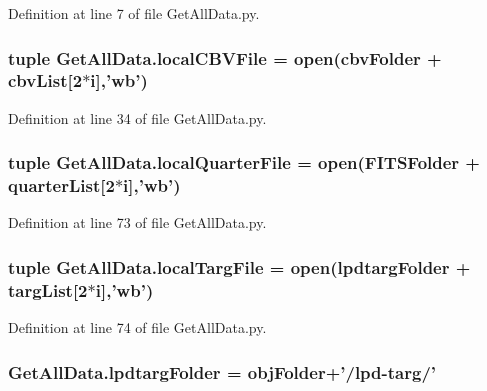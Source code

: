 Definition at line 7 of file Get\-All\-Data.\-py.

\hypertarget{namespace_get_all_data_a48b2086a8ab4a4eb4383aaa810014866}{
\subsubsection[{local\-C\-B\-V\-File}]{\setlength{\rightskip}{0pt plus 5cm}tuple Get\-All\-Data.\-local\-C\-B\-V\-File = open({\bf cbv\-Folder} + {\bf cbv\-List}\mbox{[}2$\ast$i\mbox{]},'wb')}}\label{namespace_get_all_data_a48b2086a8ab4a4eb4383aaa810014866}


Definition at line 34 of file Get\-All\-Data.\-py.

\hypertarget{namespace_get_all_data_a877740889eb38000b292aaee018666fb}{
\subsubsection[{local\-Quarter\-File}]{\setlength{\rightskip}{0pt plus 5cm}tuple Get\-All\-Data.\-local\-Quarter\-File = open({\bf F\-I\-T\-S\-Folder} + {\bf quarter\-List}\mbox{[}2$\ast$i\mbox{]},'wb')}}\label{namespace_get_all_data_a877740889eb38000b292aaee018666fb}


Definition at line 73 of file Get\-All\-Data.\-py.

\hypertarget{namespace_get_all_data_a5da9f0ddc286550f618680b99a09f13e}{
\subsubsection[{local\-Targ\-File}]{\setlength{\rightskip}{0pt plus 5cm}tuple Get\-All\-Data.\-local\-Targ\-File = open({\bf lpdtarg\-Folder} + {\bf targ\-List}\mbox{[}2$\ast$i\mbox{]},'wb')}}\label{namespace_get_all_data_a5da9f0ddc286550f618680b99a09f13e}


Definition at line 74 of file Get\-All\-Data.\-py.

\hypertarget{namespace_get_all_data_a3f0df6e75a64830be35cfc3f992806c4}{
\subsubsection[{lpdtarg\-Folder}]{ Get\-All\-Data.\-lpdtarg\-Folder = {\bf obj\-Folder}+'/lpd-\/targ/'}}\label{namespace_get_all_data_a3f0df6e75a64830be35cfc3f992806c4}


